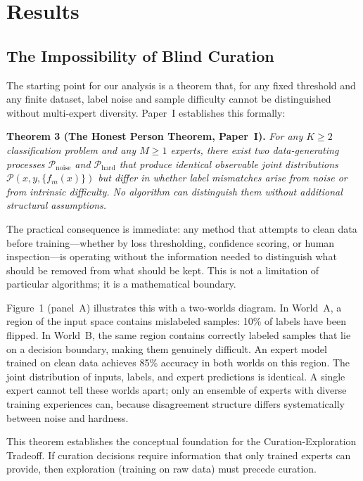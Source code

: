 \documentclass[12pt,a4paper]{article}
\begin{document}
\section{Results}

\subsection{The Impossibility of Blind Curation}

The starting point for our analysis is a theorem that, for any fixed threshold and any finite dataset, label noise and sample difficulty cannot be distinguished without multi-expert diversity. Paper~I establishes this formally:

\noindent\textbf{Theorem 3 (The Honest Person Theorem, Paper~I).} \emph{For any $K \geq 2$ classification problem and any $M \geq 1$ experts, there exist two data-generating processes $\mathcal{P}_{\text{noise}}$ and $\mathcal{P}_{\text{hard}}$ that produce identical observable joint distributions $\mathcal{P}(x, y, \{f_m(x)\})$ but differ in whether label mismatches arise from noise or from intrinsic difficulty. No algorithm can distinguish them without additional structural assumptions.}

The practical consequence is immediate: any method that attempts to clean data before training---whether by loss thresholding, confidence scoring, or human inspection---is operating without the information needed to distinguish what should be removed from what should be kept. This is not a limitation of particular algorithms; it is a mathematical boundary.

Figure~1 (panel~A) illustrates this with a two-worlds diagram. In World~A, a region of the input space contains mislabeled samples: 10\% of labels have been flipped. In World~B, the same region contains correctly labeled samples that lie on a decision boundary, making them genuinely difficult. An expert model trained on clean data achieves 85\% accuracy in both worlds on this region. The joint distribution of inputs, labels, and expert predictions is identical. A single expert cannot tell these worlds apart; only an ensemble of experts with diverse training experiences can, because disagreement structure differs systematically between noise and hardness.

This theorem establishes the conceptual foundation for the Curation-Exploration Tradeoff. If curation decisions require information that only trained experts can provide, then exploration (training on raw data) must precede curation.
\end{document}
